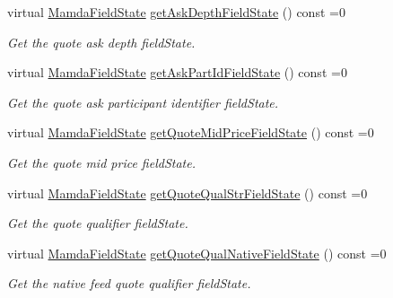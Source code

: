 \begin{CompactItemize}
virtual \hyperlink{namespaceWombat_93aac974f2ab713554fd12a1fa3b7d2a}{Mamda\-Field\-State} \hyperlink{classWombat_1_1MamdaQuoteUpdate_dac0e970dfba6fa7092bdbb6a0964845}{get\-Ask\-Depth\-Field\-State} () const =0
\begin{CompactList}\small\item\em Get the quote ask depth field\-State. \item\end{CompactList}\item 
virtual \hyperlink{namespaceWombat_93aac974f2ab713554fd12a1fa3b7d2a}{Mamda\-Field\-State} \hyperlink{classWombat_1_1MamdaQuoteUpdate_311d02bb864e1b67e106db7f6dfbd362}{get\-Ask\-Part\-Id\-Field\-State} () const =0
\begin{CompactList}\small\item\em Get the quote ask participant identifier field\-State. \item\end{CompactList}\item 
virtual \hyperlink{namespaceWombat_93aac974f2ab713554fd12a1fa3b7d2a}{Mamda\-Field\-State} \hyperlink{classWombat_1_1MamdaQuoteUpdate_cca1afbde4ff0fc48e9b245e0fc1c619}{get\-Quote\-Mid\-Price\-Field\-State} () const =0
\begin{CompactList}\small\item\em Get the quote mid price field\-State. \item\end{CompactList}\item 
virtual \hyperlink{namespaceWombat_93aac974f2ab713554fd12a1fa3b7d2a}{Mamda\-Field\-State} \hyperlink{classWombat_1_1MamdaQuoteUpdate_26ce555948a2fa3cbec38b61d7dd8195}{get\-Quote\-Qual\-Str\-Field\-State} () const =0
\begin{CompactList}\small\item\em Get the quote qualifier field\-State. \item\end{CompactList}\item 
virtual \hyperlink{namespaceWombat_93aac974f2ab713554fd12a1fa3b7d2a}{Mamda\-Field\-State} \hyperlink{classWombat_1_1MamdaQuoteUpdate_bf4211f0b7c89b9a1f3353383b5ec2d4}{get\-Quote\-Qual\-Native\-Field\-State} () const =0
\begin{CompactList}\small\item\em Get the native feed quote qualifier field\-State. \item\end{CompactList}\item 

\end{CompactItemize}
